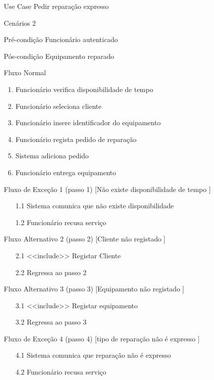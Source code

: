 \documentclass[../relatorio.tex]{subfiles}
\begin{document}
    \begin{itemize}
        \item[Use Case] {Pedir reparação expresso}
        \item[Cenários] {2} 
        \item[Pré-condição] {Funcionário autenticado} 
        \item[Pós-condição] {Equipamento reparado}
        \item[Fluxo Normal] {
            \begin{enumerate}
                \item Funcionário verifica disponibilidade de tempo
                \item Funcionário seleciona cliente
                \item Funcionário insere identificador do equipamento
                \item Funcionário regista pedido de reparação
                \item Sistema adiciona pedido
                \item Funcionário entrega equipamento
            \end{enumerate}
        }
        \item[Fluxo de Exceção 1 (passo 1) [Não existe disponibilidade de tempo]] {
            \begin{itemize}
                \item[1.1]{Sistema comunica que não existe disponibilidade}
                \item[1.2]{Funcionário recusa serviço}
            \end{itemize}
        }
        \item[Fluxo Alternativo 2 (passo 2) [Cliente não registado]] {
			\begin{itemize}
				\item[2.1]{<<include>> Registar Cliente}
				\item[2.2] {Regressa ao passo 2} 
			\end{itemize}
		}
		\item[Fluxo Alternativo 3 (passo 3) [Equipamento não registado]] {
			\begin{itemize}
				\item[3.1] <<include>> Registar equipamento
				\item[3.2] Regressa ao passo 3
			\end{itemize}
		}
        \item[Fluxo de Exceção 4 (passo 4) [tipo de reparação não é expresso]] {
            \begin{itemize}
                \item[4.1]{Sistema comunica que reparação não é expresso}
                \item[4.2]{Funcionário recusa serviço}
            \end{itemize}
        }
    \end{itemize}
\end{document}

